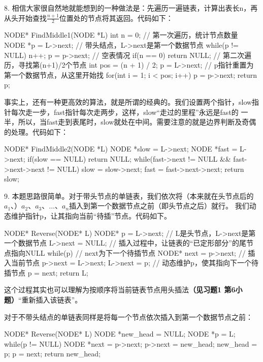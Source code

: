 8. 相信大家很自然地就能想到的一种做法是：先遍历一遍链表，计算出表长n，再从头开始查找\(\frac{n+1}{2}\)位置处的节点将其返回。代码如下：
\begin{cppcode}
    NODE* FindMiddle1(NODE *L) {
        int n = 0;
        // 第一次遍历，统计节点数量
        NODE *p = L->next;  // 带头结点，L->next是第一个数据节点
        while(p != NULL) {
            n++;
            p = p->next;
        }
        // 空表情况
        if(n == 0)
            return NULL;
        // 第二次遍历，寻找第(n+1)/2个节点
        int pos = (n + 1) / 2;
        p = L->next;    // p指针重置为第一个数据节点，从这里开始找
        for(int i = 1; i < pos; i++) {
            p = p->next;
        }
        return p;
    }
\end{cppcode}

事实上，还有一种更高效的算法，就是所谓的经典的。我们设置两个指针，slow指针每次走一步，fast指针每次走两步，这样，slow“走过的里程”永远是fast的
一半，所以，当fast走到表尾时，slow就处在中间。需要注意的就是边界判断及奇偶的处理。代码如下：
\begin{cppcode}
    NODE* FindMiddle2(NODE *L) {
        NODE *slow = L->next;
        NODE *fast = L->next;
        if(slow == NULL)
            return NULL;
        while(fast->next != NULL && fast->next->next != NULL) {
            slow = slow->next;
            fast = fast->next->next;
        }
        return slow;
    }
\end{cppcode}

9. 本题思路很简单。对于带头节点的单链表，我们依次将（本来就在头节点后的\(a_1\)、）\(a_2\)、\(a_3\)、...、\(a_n\)插入到第一个数据节点之前（即头节点之后）就行。
我们动态维护指针p，让其指向当前“待插”节点。代码如下。
\begin{cppcode}
    NODE* Reverse(NODE* L) {
        NODE* p = L->next;  // L是头节点，L->next是第一个数据节点
        L->next = NULL;     // 插入过程中，让链表的“已定形部分”的尾节点指向NULL
        while(p) {
            // next为下一个待插节点
            NODE* next = p->next;
            // 插入当前节点
            p->next = L->next;
            L->next = p;
            // 动态维护p，使其指向下一个待插节点
            p = next;
        }
        return L;
    }
\end{cppcode}
这个过程其实也可以理解为按顺序将当前链表节点用头插法{\color{red}\textbf{（见习题1 第6小题）}}“重新插入该链表”。

对于不带头结点的单链表同样是将每一个节点依次插入到第一个数据节点之前：
\begin{cppcode}
    NODE* Reverse(NODE* L) {
        NODE *new_head = NULL;
        NODE *p = L;
        while(p != NULL) {
            NODE *next = p->next;
            p->next = new_head;
            new_head = p;
            p = next;
        }
        return new_head;
    }
\end{cppcode}

